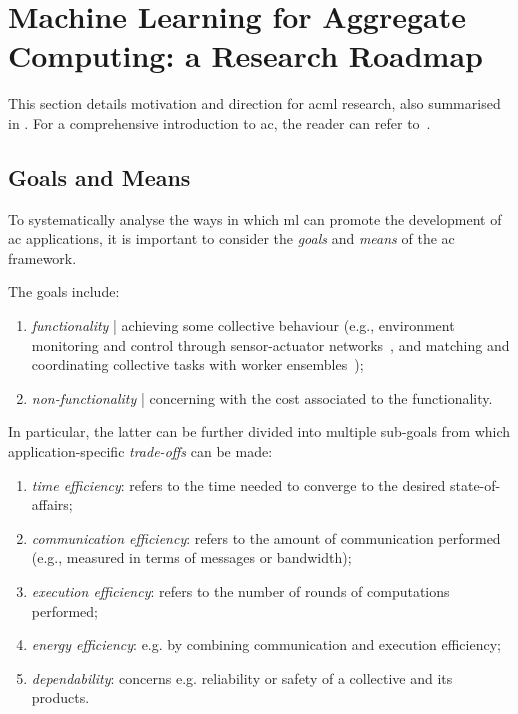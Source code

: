\section{Machine Learning for Aggregate Computing: a Research Roadmap}\label{s:roadmap}

This section details motivation and direction for \ac{acml} research,
 also summarised in .
%
For a comprehensive introduction to \ac{ac},
 the reader can refer to~\cite{DBLP:journals/jlap/ViroliBDACP19}.

\subsection{Goals and Means}

To systematically analyse the 
 ways in which \ac{ml}
 can promote the development of 
 \ac{ac} applications, 
 it is important to 
 consider the \emph{goals} and \emph{means}
 of the \ac{ac} framework.
%

The goals include:
\begin{enumerate}
\item \emph{functionality} | achieving some collective behaviour (e.g., 
  environment monitoring and control through sensor-actuator networks~\cite{DBLP:journals/fi/CasadeiPPVW20,danilo2021lmcs},
 and 
 matching and coordinating collective tasks with worker ensembles~\cite{DBLP:journals/eaai/CasadeiVAPD21});

\item \emph{non-functionality} | concerning with the cost associated to the functionality.
\end{enumerate}
%
In particular, the latter can be further divided into multiple sub-goals from which application-specific \emph{trade-offs} can be made:
\begin{enumerate}
\item \emph{time efficiency}: refers to the time needed to converge to the desired state-of-affairs;
\item \emph{communication efficiency}: refers to the amount of communication performed (e.g., measured in terms of messages or bandwidth);
\item \emph{execution efficiency}: refers to the number of rounds of computations performed;
\item \emph{energy efficiency}: e.g. by combining communication and execution efficiency;
\item \emph{dependability}: concerns e.g. reliability or safety of a collective and its products. 
\end{enumerate}

